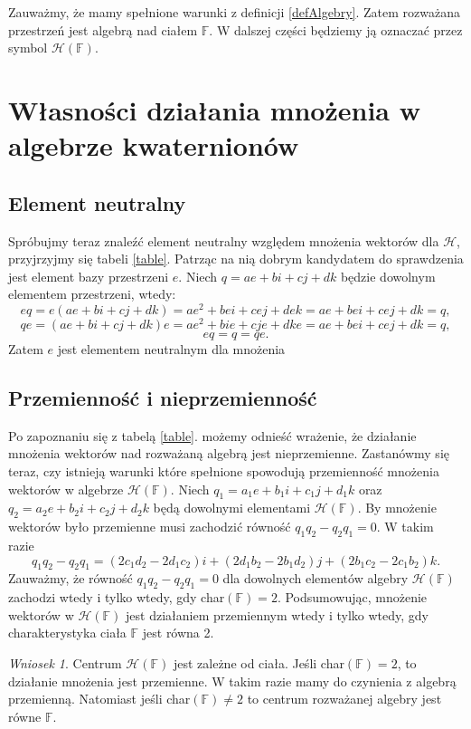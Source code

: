 \documentclass[a4paper,twoside,11pt,reqno]{mwrep}
\theoremstyle{plain} \newtheorem{twr}{Twierdzenie}
\theoremstyle{plain} \newtheorem{lem}{Lemat}
\theoremstyle{definition} \newtheorem{defi}{Definicja}
\theoremstyle{remark} \newtheorem*{wni}{Wniosek}
\theoremstyle{definition} \newtheorem{uwaga}{Uwaga}
\theoremstyle{definition}\newtheorem{prz}{Przykład}
\begin{document}
Zauważmy, że mamy spełnione warunki z definicji \ref{defAlgebry}. Zatem rozważana przestrzeń jest algebrą nad
ciałem $\mathbb{F}$. W dalszej części będziemy ją oznaczać przez symbol $\mathcal{H}\left(  \mathbb{F}\right)$.



\section{Własności działania mnożenia w algebrze kwaternionów}
\subsection{Element neutralny}
Spróbujmy teraz znaleźć element neutralny względem mnożenia wektorów dla $\mathcal{H}$, przyjrzyjmy się tabeli \ref{table}. Patrząc na nią dobrym kandydatem do sprawdzenia jest element bazy przestrzeni $e$. Niech $q = a e +b i +cj +d k$ będzie dowolnym elementem przestrzeni, wtedy:
$$e q =e( a e +b i +cj +d k) =  a e^2 +b ei +cej +d ek = a e +b ei +cej +d k=q,$$
$$ qe =( a e +b i +cj +d k)e =  a e^2 +b ie +cje +d ke = a e +b ei +cej +d k=q,$$
$$eq=q=qe.$$
Zatem $e$ jest elementem neutralnym dla mnożenia 
\subsection{Przemienność i nieprzemienność}
Po zapoznaniu się z tabelą \ref{table}. możemy odnieść wrażenie, że działanie mnożenia 
wektorów nad rozważaną algebrą jest nieprzemienne.
Zastanówmy się teraz, czy istnieją warunki które spełnione spowodują przemienność mnożenia wektorów w algebrze 
$\mathcal{H}\left( \mathbb{F}\right)$. Niech 
$q_1=a_1e +b_1 i +c_1j +d_1 k$ oraz $q_2=a_2e +b_2 i +c_2j +d_2 k$ będą dowolnymi elementami 
$\mathcal{H}\left( \mathbb{F}\right)$. By mnożenie wektorów było przemienne musi zachodzić równość $q_1q_2 -q_2q_1 = 0$. W takim razie 
$$q_1q_2 -q_2q_1  = (2c_1d_2 -2d_1c_2)i+(2d_1b_2-2b_1d_2)j+(2b_1c_2-2c_1b_2)k.$$
Zauważmy, że równość $q_1q_2 -q_2q_1 = 0$ dla dowolnych elementów algebry
$\mathcal{H}\left( \mathbb{F}\right)$ zachodzi wtedy i tylko wtedy, gdy char$(\mathbb{F})=2.$
Podsumowując, mnożenie wektorów w $\mathcal{H}\left( \mathbb{F}\right)$ jest działaniem przemiennym wtedy i tylko wtedy, gdy charakterystyka ciała $\mathbb{F}$ jest równa 2.

\begin{wni}

Centrum $\mathcal{H}(\mathbb{F})$ jest zależne od ciała. Jeśli char$ \left( \mathbb{F}
\right) = 2 $, to działanie mnożenia jest przemienne. W takim razie mamy do 
czynienia z algebrą przemienną. Natomiast jeśli char$ \left( \mathbb{F}
\right)\neq 2$ to centrum rozważanej algebry jest równe $\mathbb{F}$. 
\end{wni}
\end{document}
